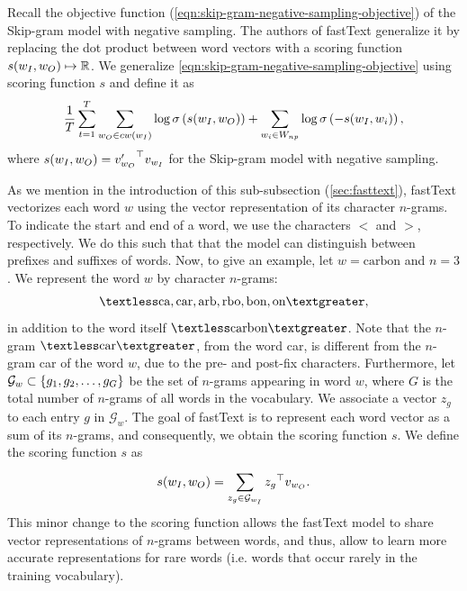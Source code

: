 Recall the objective function (\cref{eqn:skip-gram-negative-sampling-objective}) of the Skip-gram model with negative sampling. The authors of fastText generalize it by replacing the dot product between word vectors with a scoring function $s(w_I, w_O) \mapsto \mathbb{R}$. We generalize \cref{eqn:skip-gram-negative-sampling-objective} using scoring function $s$ and define it as
\begin{align}
    \frac{1}{T} \sum\limits_{t=1}^{T} \sum\limits_{w_O \in cw(w_I)}^{} \log \sigma \left( s(w_I, w_O) \right) + \sum\limits_{w_i \in W_{np}}^{} \log \sigma \left( -s(w_I, w_i) \right),
    \label{eqn:skip-gram-negative-sampling-objective-general}
\end{align}
where $s(w_I, w_O)={v'_{w_O}}^\top v_{w_I}$ for the Skip-gram model with negative sampling.

As we mention in the introduction of this sub-subsection (\cref{sec:fasttext}), fastText vectorizes each word $w$ using the vector representation of its character $n$-grams. To indicate the start and end of a word, we use the characters $<$ and $>$, respectively. We do this such that that the model can distinguish between prefixes and suffixes of words. Now, to give an example, let $w=\text{carbon}$ and $n=3$. We represent the word $w$ by character $n$-grams:
\begin{align*}
    \textless\text{ca}, \text{car}, \text{arb}, \text{rbo}, \text{bon}, \text{on}\textgreater,
\end{align*}
in addition to the word itself $\textless\text{carbon}\textgreater$. Note that the $n$-gram $\textless\text{car}\textgreater$, from the word car, is different from the $n$-gram car of the word $w$, due to the pre- and post-fix characters. Furthermore, let $\mathcal{G}_w \subset \left\{g_1, g_2, \ldots, g_G\right\}$ be the set of $n$-grams appearing in word $w$, where $G$ is the total number of $n$-grams of all words in the vocabulary. We associate a vector $z_g$ to each entry $g$ in $\mathcal{G}_w$. The goal of fastText is to represent each word vector as a sum of its $n$-grams, and consequently, we obtain the scoring function $s$. We define the scoring function $s$ as
\begin{align}
    s(w_I, w_O) = \sum\limits_{z_g \in \mathcal{G}_{w_I}}^{} {z_g}^\top v_{w_O}.
    \label{eqn:fasttext-scoring-function}
\end{align}
This minor change to the scoring function allows the fastText model to share vector representations of $n$-grams between words, and thus, allow to learn more accurate representations for rare words (i.e. words that occur rarely in the training vocabulary).

